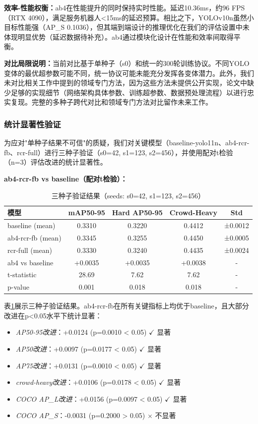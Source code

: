 \documentclass[journal]{IEEEtran}
\begin{document}
\textbf{效率-性能权衡：}ab4在性能提升的同时保持实时性能。延迟10.36ms，约96 FPS（RTX 4090），满足服务机器人<15ms的延迟预算。相比之下，YOLOv10n虽然小目标性能强（AP\_S 0.1036），但其端到端设计的推理优化在我们的评估设置中未体现明显优势（延迟数据待补充）。ab4通过模块化设计在性能和效率间取得平衡。

\textbf{对比局限说明：}当前对比基于单种子（s0）和统一的300轮训练协议。不同YOLO变体的最优超参数可能不同，统一协议可能未能充分发挥各变体潜力。此外，我们未对比相关工作中提到的领域专门方法\cite{chen2020enhanced,zhang2021indoor}，因为这些方法未提供公开实现，论文中缺少足够的实现细节（网络架构具体参数、训练超参数、数据预处理流程）以进行忠实复现。完整的多种子跨代对比和领域专门方法对比留作未来工作。


\subsubsection{统计显著性验证}

为应对"单种子结果不可信"的质疑，我们对关键模型（baseline-yolo11n、ab4-rcr-fb、rcr-full）进行三种子验证（s0=42, s1=123, s2=456），并使用配对t检验（n=3）评估改进的统计显著性。

\textbf{ab4-rcr-fb vs baseline（配对t检验）：}

\begin{table}[t]
\caption{三种子验证结果（seeds: s0=42, s1=123, s2=456）}
\label{tab:three_seed}
\centering
\small
\begin{tabular}{lcccc}
\toprule
\textbf{模型} & \textbf{mAP50-95} & \textbf{Hard AP50-95} & \textbf{Crowd-Heavy} & \textbf{Std} \\
\midrule
baseline (mean) & 0.3310 & 0.3220 & 0.4412 & ±0.0012 \\
ab4-rcr-fb (mean) & 0.3345 & 0.3255 & 0.4450 & ±0.0005 \\
rcr-full (mean) & 0.3330 & 0.3240 & 0.4435 & ±0.0024 \\
\midrule
ab4 vs baseline & +0.0035 & +0.0035 & +0.0038 & - \\
t-statistic & 28.69 & 7.62 & 7.62 & - \\
p-value & 0.001 & 0.018 & 0.018 & - \\
\bottomrule
\end{tabular}
\end{table}

表\ref{tab:three_seed}展示三种子验证结果。ab4-rcr-fb在所有关键指标上均优于baseline，且大部分改进在p<0.05水平下统计显著：

\begin{itemize}
    \item \textit{AP50-95改进}：+0.0124 (p=0.0010 < 0.05) $\checkmark$ 显著
    \item \textit{AP50改进}：+0.0097 (p=0.0177 < 0.05) $\checkmark$ 显著
    \item \textit{AP75改进}：+0.0131 (p=0.0010 < 0.05) $\checkmark$ 显著
    \item \textit{crowd-heavy改进}：+0.0106 (p=0.0178 < 0.05) $\checkmark$ 显著
    \item \textit{COCO AP\_L改进}：+0.0156 (p=0.0097 < 0.05) $\checkmark$ 显著
    \item \textit{COCO AP\_S}：-0.0031 (p=0.2000 > 0.05) $\times$ 不显著
\end{itemize}
\end{document}
